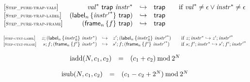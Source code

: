 \documentclass{article}
\begin{document}
\vspace{1ex}

$$
\begin{array}{@{}l@{}rcl@{}l@{}}
	{[\textsc{\scriptsize Step\_pure{-}trap{-}vals}]} \quad & {{\mathit{val}}^\ast}~\mathsf{trap}~{{\mathit{instr}}^\ast} &\hookrightarrow& \mathsf{trap}
	&\qquad \mbox{if}~{{\mathit{val}}^\ast} \neq \epsilon \lor {{\mathit{instr}}^\ast} \neq \epsilon \\
	{[\textsc{\scriptsize Step\_pure{-}trap{-}label}]} \quad & ({\mathsf{label}}_{n}\,\{ {{\mathit{instr}'}^\ast} \}~\mathsf{trap}) &\hookrightarrow& \mathsf{trap} \\
	{[\textsc{\scriptsize Step\_pure{-}trap{-}frame}]} \quad & ({\mathsf{frame}}_{n}\,\{ f \}~\mathsf{trap}) &\hookrightarrow& \mathsf{trap} \\
\end{array}
$$

\vspace{1ex}

$$
\begin{array}{@{}l@{}rcl@{}l@{}}
	{[\textsc{\scriptsize Step{-}ctxt{-}label}]} \quad & z ; ({\mathsf{label}}_{n}\,\{ {{\mathit{instr}}_0^\ast} \}~{{\mathit{instr}}^\ast}) &\hookrightarrow& {z'} ; ({\mathsf{label}}_{n}\,\{ {{\mathit{instr}}_0^\ast} \}~{{\mathit{instr}'}^\ast})
	&\qquad \mbox{if}~z ; {{\mathit{instr}}^\ast} \hookrightarrow {z'} ; {{\mathit{instr}'}^\ast} \\
	{[\textsc{\scriptsize Step{-}ctxt{-}frame}]} \quad & s ; f ; ({\mathsf{frame}}_{n}\,\{ {f'} \}~{{\mathit{instr}}^\ast}) &\hookrightarrow& {s'} ; f ; ({\mathsf{frame}}_{n}\,\{ {f'} \}~{{\mathit{instr}'}^\ast})
	&\qquad \mbox{if}~s ; {f'} ; {{\mathit{instr}}^\ast} \hookrightarrow {s'} ; {f'} ; {{\mathit{instr}'}^\ast} \\
\end{array}
$$

\vspace{1ex}

$$
\begin{array}{@{}lcl@{}l@{}}
	{\mathrm{iadd}}(N, c_1, c_2) &=& (c_1 + c_2) \mathbin{\mathrm{mod}} {2^{N}} \\
\end{array}
$$

$$
\begin{array}{@{}lcl@{}l@{}}
	{\mathrm{isub}}(N, c_1, c_2) &=& (c_1 - c_2 + {2^{N}}) \mathbin{\mathrm{mod}} {2^{N}} \\
\end{array}
$$
\end{document}

